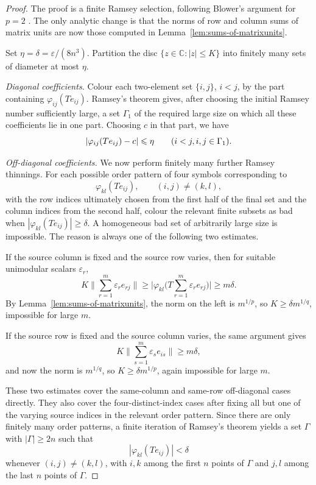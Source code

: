 \documentclass[11pt]{amsart}
\theoremstyle{plain}
\theoremstyle{definition}
\numberwithin{equation}{section}
\newcommand{\C}{\mathbb{C}}
\renewcommand{\le}{\leqslant}
\renewcommand{\ge}{\geqslant}
\begin{document}
\begin{proof}
The proof is a finite Ramsey selection, following Blower's argument for $p=2$ \cite[\S2, Proposition~1]{Blower1990}.  The only analytic change is that the norms of row and column sums of matrix units are now those computed in Lemma~\ref{lem:sums-of-matrixunits}.

Set $\eta=\delta=\varepsilon/(8n^3)$.  Partition the disc $\{z\in\C: |z|\le K\}$ into finitely many sets of diameter at most $\eta$.

\smallskip\noindent
\emph{Diagonal coefficients.}
Colour each two-element set $\{i,j\}$, $i<j$, by the part containing $\varphi_{ij}(Te_{ij})$.  Ramsey's theorem gives, after choosing the initial Ramsey number sufficiently large, a set $\Gamma_1$ of the required large size on which all these coefficients lie in one part.  Choosing $c$ in that part, we have
\[
    |\varphi_{ij}(Te_{ij})-c|\le \eta
    \qquad (i<j,\\ i,j\in\Gamma_1).
\]

\smallskip\noindent
\emph{Off-diagonal coefficients.}
We now perform finitely many further Ramsey thinnings.  For each possible order pattern of four symbols corresponding to
\[
    \varphi_{kl}(Te_{ij}), \qquad (i,j)\ne(k,l),
\]
with the row indices ultimately chosen from the first half of the final set and the column indices from the second half, colour the relevant finite subsets as bad when
$|\varphi_{kl}(Te_{ij})|\ge\delta$.
A homogeneous bad set of arbitrarily large size is impossible.  The reason is always one of the following two estimates.

If the source column is fixed and the source row varies, then for suitable unimodular scalars $\varepsilon_r$,
\[
K\Big\|\sum_{r=1}^m \varepsilon_r e_{rj}\Big\|
\ge
\Big|\varphi_{kl}\Big(T\sum_{r=1}^m \varepsilon_r e_{rj}\Big)\Big|
\ge m\delta.
\]
By Lemma~\ref{lem:sums-of-matrixunits}, the norm on the left is $m^{1/p}$, so $K\ge\delta m^{1/q}$, impossible for large $m$.

If the source row is fixed and the source column varies, the same argument gives
\[
K\Big\|\sum_{s=1}^m \varepsilon_s e_{is}\Big\|
\ge m\delta,
\]
and now the norm is $m^{1/q}$, so $K\ge\delta m^{1/p}$, again impossible for large $m$.

These two estimates cover the same-column and same-row off-diagonal cases directly.  They also cover the four-distinct-index cases after fixing all but one of the varying source indices in the relevant order pattern.  Since there are only finitely many order patterns, a finite iteration of Ramsey's theorem yields a set $\Gamma$ with $|\Gamma|\ge 2n$ such that
\[
    |\varphi_{kl}(Te_{ij})|<\delta
\]
whenever $(i,j)\ne(k,l)$, with $i,k$ among the first $n$ points of $\Gamma$ and $j,l$ among the last $n$ points of $\Gamma$.


\end{proof}
\end{document}
